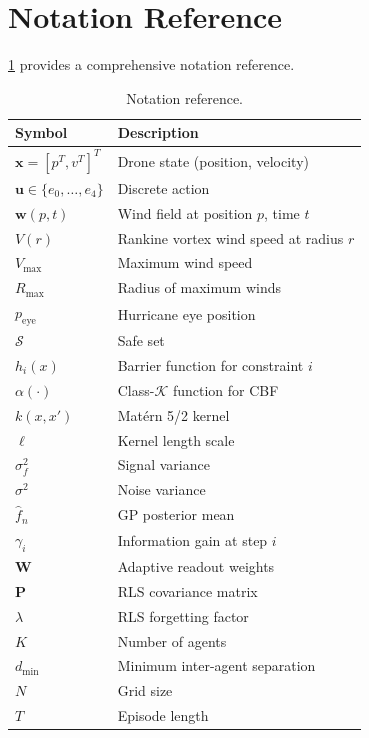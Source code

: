 \documentclass[11pt,twocolumn]{article}
\providecommand{\Cref}[1]{\ref{#1}}
\theoremstyle{definition}
\newcommand{\cS}{\mathcal{S}}
\newcommand{\cK}{\mathcal{K}}
\newcommand{\vect}[1]{\mathbf{#1}}
\newcommand{\mat}[1]{\mathbf{#1}}
\begin{document}
\section{Notation Reference}
\label{app:notation}

\Cref{tab:notation} provides a comprehensive notation reference.

\begin{table}[h]
\centering
\caption{Notation reference.}
\label{tab:notation}
\small
\begin{tabular}{ll}
\toprule
\textbf{Symbol} & \textbf{Description} \\
\midrule
$\vect{x} = [p^T, v^T]^T$ & Drone state (position, velocity) \\
$\vect{u} \in \{e_0, \ldots, e_4\}$ & Discrete action \\
$\vect{w}(p,t)$ & Wind field at position $p$, time $t$ \\
$V(r)$ & Rankine vortex wind speed at radius $r$ \\
$V_{\max}$ & Maximum wind speed \\
$R_{\max}$ & Radius of maximum winds \\
$p_{\text{eye}}$ & Hurricane eye position \\
$\cS$ & Safe set \\
$h_i(x)$ & Barrier function for constraint $i$ \\
$\alpha(\cdot)$ & Class-$\cK$ function for CBF \\
$k(x,x')$ & Mat\'ern 5/2 kernel \\
$\ell$ & Kernel length scale \\
$\sigma_f^2$ & Signal variance \\
$\sigma^2$ & Noise variance \\
$\hat{f}_n$ & GP posterior mean \\
$\gamma_i$ & Information gain at step $i$ \\
$\mat{W}$ & Adaptive readout weights \\
$\mat{P}$ & RLS covariance matrix \\
$\lambda$ & RLS forgetting factor \\
$K$ & Number of agents \\
$d_{\min}$ & Minimum inter-agent separation \\
$N$ & Grid size \\
$T$ & Episode length \\
\bottomrule
\end{tabular}
\end{table}
\end{document}
